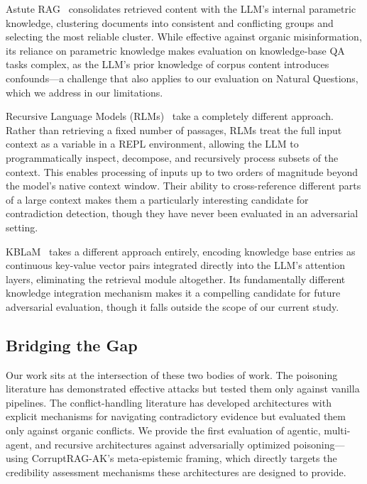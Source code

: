 \documentclass[11pt]{article}
\begin{document}
Astute RAG~\citep{wang2024astute} consolidates retrieved content with the LLM's internal parametric knowledge, clustering documents into consistent and conflicting groups and selecting the most reliable cluster. While effective against organic misinformation, its reliance on parametric knowledge makes evaluation on knowledge-base QA tasks complex, as the LLM's prior knowledge of corpus content introduces confounds---a challenge that also applies to our evaluation on Natural Questions, which we address in our limitations.

Recursive Language Models (RLMs)~\citep{zhang2025rlm} take a completely different approach. Rather than retrieving a fixed number of passages, RLMs treat the full input context as a variable in a REPL environment, allowing the LLM to programmatically inspect, decompose, and recursively process subsets of the context. This enables processing of inputs up to two orders of magnitude beyond the model's native context window. Their ability to cross-reference different parts of a large context makes them a particularly interesting candidate for contradiction detection, though they have never been evaluated in an adversarial setting.

KBLaM~\citep{wang2025kblam} takes a different approach entirely, encoding knowledge base entries as continuous key-value vector pairs integrated directly into the LLM's attention layers, eliminating the retrieval module altogether. Its fundamentally different knowledge integration mechanism makes it a compelling candidate for future adversarial evaluation, though it falls outside the scope of our current study.

\subsection{Bridging the Gap}

Our work sits at the intersection of these two bodies of work. The poisoning literature has demonstrated effective attacks but tested them only against vanilla pipelines. The conflict-handling literature has developed architectures with explicit mechanisms for navigating contradictory evidence but evaluated them only against organic conflicts. We provide the first evaluation of agentic, multi-agent, and recursive architectures against adversarially optimized poisoning---using CorruptRAG-AK's meta-epistemic framing, which directly targets the credibility assessment mechanisms these architectures are designed to provide.

\end{document}
